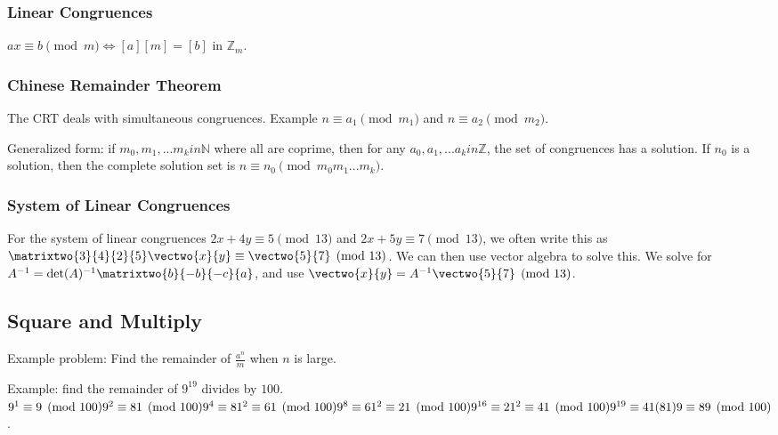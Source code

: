 \documentclass[12pt]{article}
\begin{document}
\subsubsection*{Linear Congruences}
$ax \equiv b \pmod m \iff [a][m] = [b]$ in $\mathbb{Z}_m$.


\subsubsection*{Chinese Remainder Theorem}
The CRT deals with simultaneous congruences. Example $n \equiv a_1 \pmod m_1$ and $n \equiv a_2 \pmod m_2$.


Generalized form: if $m_0, m_1, ... m_k in \mathbb{N}$ where all are coprime, then for any $a_0, a_1, ... a_k in \mathbb{Z}$, the set of congruences has a solution. If $n_0$ is a solution, then the complete solution set is $n \equiv n_0 \pmod{m_0m_1...m_k}$.

\subsubsection*{System of Linear Congruences}
For the system of linear congruences $2x + 4y \equiv 5 \pmod{13}$ and $2x + 5y \equiv 7 \pmod{13}$, we often write this as $\matrixtwo{3}{4}{2}{5} \vectwo{x}{y} \equiv \vectwo{5}{7} \pmod{13}$. We can then use vector algebra to solve this. We solve for $A^{-1} = \det(A)^{-1} \matrixtwo{b}{-b}{-c}{a}$, and use $\vectwo{x}{y} = A^{-1} \vectwo{5}{7} \pmod{13}$.

\subsection*{Square and Multiply}
Example problem: Find the remainder of $\frac{a^n}{m}$ when $n$ is large.

Example: find the remainder of $9^19$ divides by $100$.\\
$9^1 \equiv 9 \pmod{100}\\
9^2 \equiv 81 \pmod{100}\\
9^4 \equiv 81^2 \equiv 61 \pmod{100}\\
9^8 \equiv 61^2 \equiv 21 \pmod{100}\\
9^{16} \equiv 21^2 \equiv 41 \pmod{100}\\
9^{19} \equiv 41(81)9 \equiv 89 \pmod{100}$.
\end{document}
